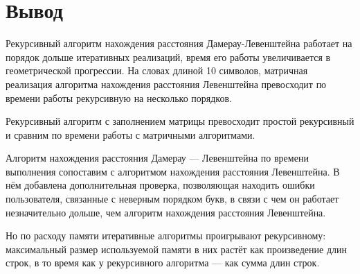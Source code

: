 \section*{Вывод}

Рекурсивный алгоритм нахождения расстояния Дамерау-Левенштейна работает на порядок дольше итеративных реализаций, время его работы увеличивается в геометрической прогрессии. На словах длиной 10 символов, матричная реализация алгоритма нахождения расстояния Левенштейна превосходит по времени работы рекурсивную на несколько порядков.

Рекурсивный алгоритм с заполнением матрицы превосходит простой рекурсивный и сравним по времени работы с матричными алгоритмами. 

Алгоритм нахождения расстояния Дамерау — Левенштейна по времени выполнения сопоставим с алгоритмом нахождения расстояния Левенштейна. В нём добавлена дополнительная проверка, позволяющая находить ошибки пользователя, связанные с неверным порядком букв, в связи с чем он работает незначительно дольше, чем алгоритм нахождения расстояния Левенштейна.

Но по расходу памяти итеративные алгоритмы проигрывают рекурсивному: максимальный размер используемой памяти в них растёт как произведение длин строк, в то время как у рекурсивного алгоритма — как сумма длин строк.
